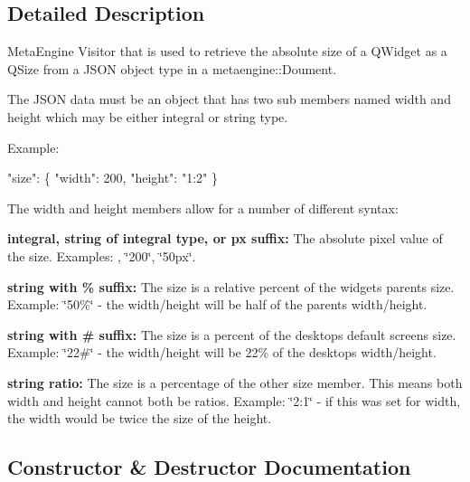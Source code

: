 \subsection{Detailed Description}
Meta\+Engine Visitor that is used to retrieve the absolute size of a Q\+Widget as a Q\+Size from a J\+S\+O\+N object type in a metaengine\+::\+Doument. 

The J\+S\+O\+N data must be an object that has two sub members named {\ttfamily width} and {\ttfamily height} which may be either integral or string type.

Example\+:


\begin{DoxyCode}
\textcolor{stringliteral}{"size"}:
 \{
     \textcolor{stringliteral}{"width"}: 200,
     \textcolor{stringliteral}{"height"}: \textcolor{stringliteral}{"1:2"}
 \}
\end{DoxyCode}


The {\ttfamily width} and {\ttfamily height} members allow for a number of different syntax\+:


\begin{DoxyItemize}
\item {\bfseries integral, string of integral type, or {\ttfamily px} suffix\+:} The absolute pixel value of the size. Examples\+: {}, {\ttfamily \char`\"{}200\char`\"{}}, {\ttfamily \char`\"{}50px\char`\"{}}.
\item {\bfseries string with {\ttfamily \%} suffix\+:} The size is a relative percent of the widget\textquotesingle{}s parent\textquotesingle{}s size. Example\+: {\ttfamily \char`\"{}50\%\char`\"{}} -\/ the width/height will be half of the parent\textquotesingle{}s width/height.
\item {\bfseries string with {\ttfamily \#} suffix\+:} The size is a percent of the desktop\textquotesingle{}s default screen\textquotesingle{}s size. Example\+: {\ttfamily \char`\"{}22\#\char`\"{}} -\/ the width/height will be 22\% of the desktop\textquotesingle{}s width/height.
\item {\bfseries string ratio\+: } The size is a percentage of the other size member. This means both width and height cannot both be ratios. Example\+: {\ttfamily \char`\"{}2\+:1\char`\"{}} -\/ if this was set for width, the width would be twice the size of the height. 
\end{DoxyItemize}

\subsection{Constructor \& Destructor Documentation}
\hypertarget{classmeta__qt_1_1_widget_size_adaef79cc1c5a01f2cf2f6a5a901925ad}{}
